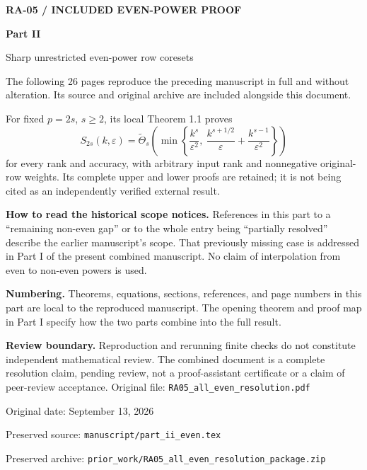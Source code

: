 \documentclass[11pt]{article}
\begin{document}
\vspace*{1.2cm}
{\small\bfseries RA-05 / INCLUDED EVEN-POWER PROOF}\par\vspace{1cm}
{\Huge\bfseries Part II}\par\vspace{.5cm}
{\Large Sharp unrestricted even-power row coresets}\par\vspace{.9cm}
The following 26 pages reproduce the preceding manuscript in full and without alteration. Its source and original archive are included alongside this document.

For fixed $p=2s$, $s\ge2$, its local Theorem 1.1 proves
\[
 S_{2s}(k,\varepsilon)=\widetilde\Theta_s\!\left(
 \min\left\{\frac{k^s}{\varepsilon^2},\
 \frac{k^{s+1/2}}{\varepsilon}+\frac{k^{s-1}}{\varepsilon^2}\right\}\right)
\]
for every rank and accuracy, with arbitrary input rank and nonnegative original-row weights. Its complete upper and lower proofs are retained; it is not being cited as an independently verified external result.

\textbf{How to read the historical scope notices.}
References in this part to a ``remaining non-even gap'' or to the whole entry being ``partially resolved'' describe the earlier manuscript's scope. That previously missing case is addressed in Part I of the present combined manuscript. No claim of interpolation from even to non-even powers is used.

\textbf{Numbering.}
Theorems, equations, sections, references, and page numbers in this part are local to the reproduced manuscript. The opening theorem and proof map in Part I specify how the two parts combine into the full result.

\textbf{Review boundary.}
Reproduction and rerunning finite checks do not constitute independent mathematical review. The combined document is a complete resolution claim, pending review, not a proof-assistant certificate or a claim of peer-review acceptance.
\vfill
Original file: \texttt{RA05\_all\_even\_resolution.pdf}\par
Original date: September 13, 2026\par
Preserved source: \texttt{manuscript/part\_ii\_even.tex}\par
Preserved archive: \texttt{prior\_work/RA05\_all\_even\_resolution\_package.zip}
\end{document}

